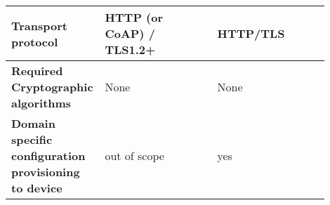 \begin{longtable}{|p{0.2\linewidth}|p{0.35\linewidth}|p{0.35\linewidth}|}
		\hline
		\cellcolor[rgb]{ .745, .804, .843}\textbf{Transport protocol} & HTTP (or CoAP) / TLS1.2+ & HTTP/TLS \\

		\hline
		\cellcolor[rgb]{ .745, .804, .843}\textbf{Required Cryptographic algorithms } & None & None \\

		\hline
		\cellcolor[rgb]{ .745, .804, .843}\textbf{Domain specific configuration provisioning to device} & out of scope & yes \\
		\hline

\end{longtable}
%
%
